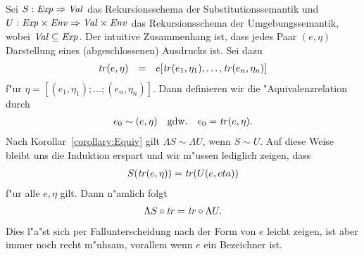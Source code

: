 \documentclass[12pt,a4paper]{article}
\begin{document}
Sei $S: \mathit{Exp} \Rightarrow \mathit{Val}$ das Rekursionsschema der Substitutionssemantik und
$U: \mathit{Exp} \times \mathit{Env} \Rightarrow \mathit{Val} \times \mathit{Env}$ das Rekursionsschema der Umgebungssemantik,
wobei $\mathit{Val} \subseteq \mathit{Exp}$.
Der intuitive Zusammenhang ist, dass jedes Paar $(e,\eta)$ Darstellung eines
(abgeschlossenen) Ausdrucks ist. Sei dazu
\[\begin{array}{rcl}
  \mathit{tr}(e,\eta) &=& e[\mathit{tr}(e_1,\eta_1),\ldots,\mathit{tr}(e_n,\eta_n)]
\end{array}\]
f"ur $\eta = [(e_1,\eta_1);\ldots;(e_n,\eta_n)]$. Dann definieren wir die "Aquivalenzrelation
durch
\[\begin{array}{rcl}
  e_0 \sim (e,\eta) &\text{gdw.}& e_0 = \mathit{tr}(e,\eta).
\end{array}\]
Nach Korollar~\ref{corollary:Equiv} gilt $\Lambda S \sim \Lambda U$, wenn $S \sim U$. Auf diese
Weise bleibt uns die Induktion erspart und wir m"ussen lediglich zeigen, dass 
\[\begin{array}{rcl}
  S(\mathit{tr}(e,\eta)) = \mathit{tr}(U(e,eta))
\end{array}\]
f"ur alle $e,\eta$ gilt. Dann n"amlich folgt
\[\begin{array}{rcl}
  \Lambda S \circ \mathit{tr} = \mathit{tr} \circ \Lambda U.
\end{array}\]
Dies l"a"st sich per Fallunterscheidung nach der Form von $e$ leicht
zeigen, ist aber immer noch recht m"uhsam, vorallem wenn $e$ ein Bezeichner ist.
\end{document}
